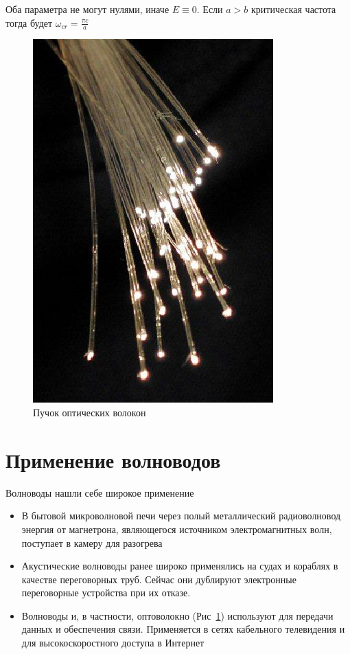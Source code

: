 \documentclass[a4paper, 14pt]{article}
\begin{document}
    Оба параметра не могут нулями, иначе $E \equiv 0$.
    Если $a > b$ критическая частота тогда будет $\omega_{cr} = \frac{\pi c}{a}$
    
    \begin{figure}[h]
        \begin{center}
            \begin{minipage}[h]{0.74\linewidth}
                \centering
                \includegraphics[width = 0.47 \textwidth]{fibreoptic}
                \caption{Пучок оптических волокон}
                \label{fig:fibreoptic}
            \end{minipage}
        \end{center}
    \end{figure}
    
    \section*{Применение волноводов} 
    
    Волноводы нашли себе широкое применение
    
    \begin{itemize}
        \item В бытовой микроволновой печи через полый металлический радиоволновод энергия от магнетрона, являющегося
        источником электромагнитных волн, поступает в камеру для разогрева
        \item Акустические волноводы ранее широко применялись на судах и кораблях в качестве переговорных труб.
        Сейчас они дублируют электронные переговорные устройства при их отказе.
        \item Волноводы и, в частности, оптоволокно (Рис~\ref{fig:fibreoptic}) используют для передачи данных и
        обеспечения связи.
        Применяется в сетях кабельного телевидения и для высокоскоростного доступа в Интернет
    \end{itemize}
    
\end{document}
